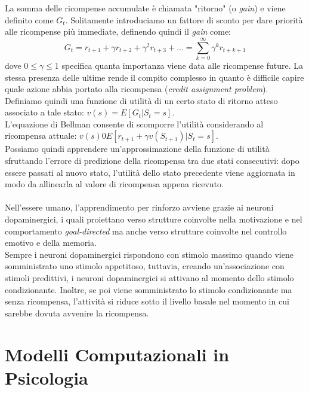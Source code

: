 \documentclass[12pt, a4paper]{article}
\begin{document}
La somma delle ricompense accumulate è chiamata "ritorno" (o \textit{gain}) e viene definito come \(G_t\). Solitamente introduciamo un fattore di sconto per dare priorità alle ricompense più immediate, definendo quindi il \textit{gain} come:
\[G_t = r_{t+1} + \gamma r_{t+2} + \gamma^2 r_{t+3} + ... = \sum_{k=0}^\infty \gamma^k r_{t+k+1}\]
dove \(0 \leq \gamma \leq 1 \) specifica quanta importanza viene data alle ricompense future. La stessa presenza delle ultime rende il compito complesso in quanto è difficile capire quale azione abbia portato alla ricompensa (\textit{credit assignment problem}).\\
Definiamo quindi una funzione di utilità di un certo stato di ritorno atteso associato a tale stato: \(v(s) = E[G_t | S_t = s]\). \\
L'equazione di Bellman consente di scomporre l'utilità considerando al ricompensa attuale: \(v(s) 0 E[r_{t+1} + \gamma v(S_{t+1}) | S_t = s]\).\\
Possiamo quindi apprendere un'approssimazione della funzione di utilità sfruttando l'errore di predizione della ricompensa tra due stati consecutivi: dopo essere passati al nuovo stato, l'utilità dello stato precedente viene aggiornata in modo da allinearla al valore di ricompensa appena ricevuto.\\
\\
Nell'essere umano, l'apprendimento per rinforzo avviene grazie ai neuroni dopaminergici, i quali proiettano verso strutture coinvolte nella motivazione e nel comportamento \textit{goal-directed} ma anche verso strutture coinvolte nel controllo emotivo e della memoria.\\
Sempre i neuroni dopaminergici rispondono con stimolo massimo quando viene somministrato uno stimolo appetitoso, tuttavia, creando un'associazione con stimoli predittivi, i neuroni dopaminergici si attivano al momento dello stimolo condizionante. Inoltre, se poi viene somministrato lo stimolo condizionante ma senza ricompensa, l'attività si riduce sotto il livello basale nel momento in cui sarebbe dovuta avvenire la ricompensa.\\

\section{Modelli Computazionali in Psicologia}
\end{document}
